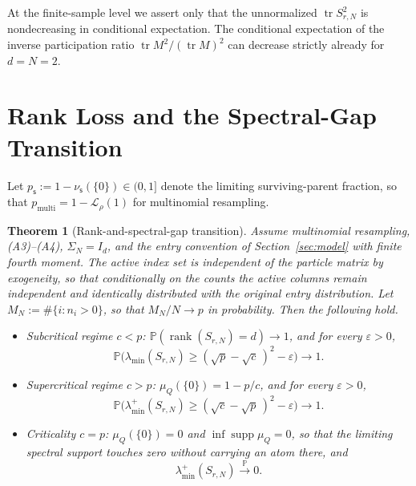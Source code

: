 \documentclass[lettersize,journal]{IEEEtran}
\newtheorem{theo}{Theorem}
\theoremstyle{remark}
\begin{document}
At the finite-sample level we assert only that the unnormalized
$\operatorname{tr}S_{r,N}^2$ is nondecreasing in conditional expectation. The
conditional expectation of the inverse participation ratio
$\operatorname{tr}M^2/(\operatorname{tr}M)^2$ can decrease strictly already for
$d=N=2$.

\section{Rank Loss and the Spectral-Gap Transition}
\label{sec:rankgap}

Let $p_{\mathsf{s}}:=1-\nu_{\mathsf{s}}(\{0\})\in(0,1]$ denote the limiting
surviving-parent fraction, so that
$p_{\mathrm{multi}}=1-\mathcal{L}_\rho(1)$ for multinomial resampling.

\begin{theo}[Rank-and-spectral-gap transition\cite{baik2005phase}]
\label{thm:rankgap}
Assume multinomial resampling, (A3)--(A4), $\Sigma_N=I_d$, and the entry
convention of Section~\ref{sec:model} with finite fourth moment. The active
index set is independent of the particle matrix by exogeneity, so that
conditionally on the counts the active columns remain independent and
identically distributed with the original entry distribution. Let
$M_N:=\#\{i:n_i>0\}$, so that $M_N/N\to p$ in probability. Then the following
hold.
\begin{itemize}
  \item[(i)] \emph{Subcritical regime} $c<p$:
    $\mathbb{P}(\operatorname{rank}(S_{r,N})=d)\to1$, and for every
    $\varepsilon>0$,
    \begin{equation}
      \mathbb{P}\Big(\lambda_{\min}(S_{r,N})
        \ge(\sqrt p-\sqrt c\,)^2-\varepsilon\Big)\to1.
      \label{eq:subcrit}
    \end{equation}
  \item[(ii)] \emph{Supercritical regime} $c>p$: $\mu_Q(\{0\})=1-p/c$, and for
    every $\varepsilon>0$,
    \begin{equation}
      \mathbb{P}\Big(\lambda_{\min}^{+}(S_{r,N})
        \ge(\sqrt c-\sqrt p\,)^2-\varepsilon\Big)\to1.
      \label{eq:supercrit}
    \end{equation}
  \item[(iii)] \emph{Criticality} $c=p$: $\mu_Q(\{0\})=0$ and
    $\inf\operatorname{supp}\mu_Q=0$, so that the limiting spectral support
    touches zero without carrying an atom there, and
    \begin{equation}
      \lambda_{\min}^{+}(S_{r,N})\xrightarrow{\ \mathbb{P}\ }0.
      \label{eq:crit}
    \end{equation}
\end{itemize}
\end{theo}
\end{document}
